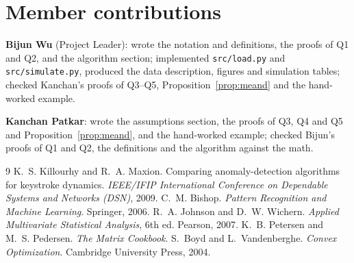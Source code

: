 \documentclass[11pt]{article}
\theoremstyle{definition}
\begin{document}
\section{Member contributions}
\textbf{Bijun Wu} (Project Leader): wrote the notation and definitions, the proofs of Q1 and Q2, and the algorithm section; implemented \texttt{src/load.py} and \texttt{src/simulate.py}, produced the data description, figures and simulation tables; checked Kanchan's proofs of Q3--Q5, Proposition~\ref{prop:meand} and the hand-worked example.

\textbf{Kanchan Patkar}: wrote the assumptions section, the proofs of Q3, Q4 and Q5 and Proposition~\ref{prop:meand}, and the hand-worked example; checked Bijun's proofs of Q1 and Q2, the definitions and the algorithm against the math.

\begin{thebibliography}{9}
 K.~S. Killourhy and R.~A. Maxion. Comparing anomaly-detection algorithms for keystroke dynamics. \emph{IEEE/IFIP International Conference on Dependable Systems and Networks (DSN)}, 2009.
 C.~M. Bishop. \emph{Pattern Recognition and Machine Learning}. Springer, 2006.
 R.~A. Johnson and D.~W. Wichern. \emph{Applied Multivariate Statistical Analysis}, 6th ed. Pearson, 2007.
 K.~B. Petersen and M.~S. Pedersen. \emph{The Matrix Cookbook}.
 S.~Boyd and L.~Vandenberghe. \emph{Convex Optimization}. Cambridge University Press, 2004.
\end{thebibliography}
\end{document}
